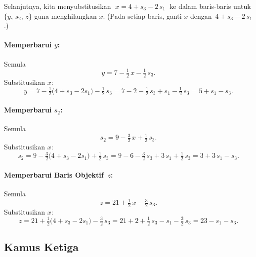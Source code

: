 Selanjutnya, kita menyubstitusikan 
\(\;x = 4 + s_3 - 2\,s_1\;\)
ke dalam baris-baris untuk \(\{y,\,s_2,\,z\}\) guna menghilangkan \(x\).  
(Pada setiap baris, ganti \(x\) dengan \(\,4 + s_3 - 2\,s_1\).)

\paragraph{Memperbarui \(y\):}

Semula 
\[
y = 7 - \tfrac12\,x - \tfrac12\,s_3.
\]
Substitusikan \(x\):
\[
y
= 7 
- \tfrac12\bigl(4 + s_3 - 2s_1\bigr)
- \tfrac12\,s_3
=
7 - 2 - \tfrac12\,s_3 + s_1 - \tfrac12\,s_3
=
5 + s_1 - s_3.
\]

\paragraph{Memperbarui \(s_2\):}

Semula
\[
s_2 = 9 - \tfrac32\,x + \tfrac12\,s_3.
\]
Substitusikan \(x\):
\[
s_2
= 9 
- \tfrac32\bigl(4 + s_3 - 2s_1\bigr)
+ \tfrac12\,s_3
= 
9 - 6 - \tfrac32\,s_3 + 3\,s_1 + \tfrac12\,s_3
=
3 + 3\,s_1 - s_3.
\]

\paragraph{Memperbarui Baris Objektif \(\,z\):}

Semula
\[
z = 21 + \tfrac12\,x - \tfrac32\,s_3.
\]
Substitusikan \(x\):
\[
z
= 
21 
+ \tfrac12\bigl(4 + s_3 - 2s_1\bigr)
- \tfrac32\,s_3
=
21 + 2 + \tfrac12\,s_3 - s_1 - \tfrac32\,s_3
=
23 - s_1 - s_3.
\]

\subsection*{Kamus Ketiga}

